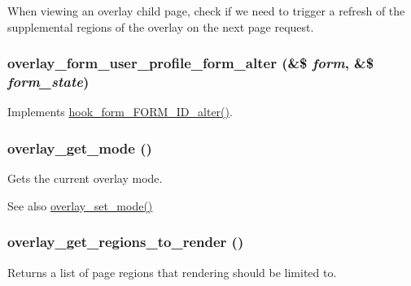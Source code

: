 When viewing an overlay child page, check if we need to trigger a refresh of the supplemental regions of the overlay on the next page request. \hypertarget{overlay_8module_a42fa72cb204d2afbf03fe801842ea3ef}{
\subsubsection[{overlay\_\-form\_\-user\_\-profile\_\-form\_\-alter}]{\setlength{\rightskip}{0pt plus 5cm}overlay\_\-form\_\-user\_\-profile\_\-form\_\-alter (\&\$ {\em form}, \/  \&\$ {\em form\_\-state})}}
\label{overlay_8module_a42fa72cb204d2afbf03fe801842ea3ef}
Implements \hyperlink{group__hooks_ga8d4a4089551493d55911bd5c4f218264}{hook\_\-form\_\-FORM\_\-ID\_\-alter()}. \hypertarget{overlay_8module_a3d783a955948f187d6777f7671531621}{
\subsubsection[{overlay\_\-get\_\-mode}]{\setlength{\rightskip}{0pt plus 5cm}overlay\_\-get\_\-mode ()}}
\label{overlay_8module_a3d783a955948f187d6777f7671531621}
Gets the current overlay mode.

\begin{DoxySeeAlso}{See also}
\hyperlink{overlay_8module_a140f35bbeb7988cef4be585beba86348}{overlay\_\-set\_\-mode()} 
\end{DoxySeeAlso}
\hypertarget{overlay_8module_a1881ec6bb74538db7efd8bbd374d00e7}{
\subsubsection[{overlay\_\-get\_\-regions\_\-to\_\-render}]{\setlength{\rightskip}{0pt plus 5cm}overlay\_\-get\_\-regions\_\-to\_\-render ()}}
\label{overlay_8module_a1881ec6bb74538db7efd8bbd374d00e7}
Returns a list of page regions that rendering should be limited to.

